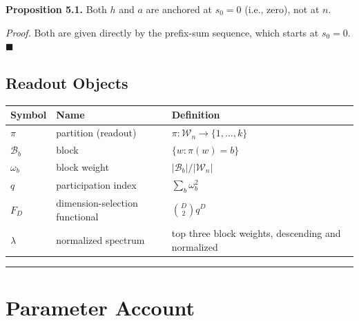 \documentclass[
  11pt,
]{article}
\newcounter{none} %
\begin{document}
\textbf{Proposition 5.1.} Both \(h\) and \(a\) are anchored at \(s_0=0\)
(i.e., zero), not at \(n\).

\emph{Proof.} Both are given directly by the prefix-sum sequence, which
starts at \(s_0=0\). \(\blacksquare\)

\subsection{Readout Objects}\label{readout-objects}

{\def\LTcaptype{none} %
\begin{longtable}[]{@{}
  >{\raggedright\arraybackslash}p{}
  >{\raggedright\arraybackslash}p{}
  >{\raggedright\arraybackslash}p{}@{}}
\toprule\noalign{}
\begin{minipage}[b]{\linewidth}\raggedright
Symbol
\end{minipage} & \begin{minipage}[b]{\linewidth}\raggedright
Name
\end{minipage} & \begin{minipage}[b]{\linewidth}\raggedright
Definition
\end{minipage} \\
\midrule\noalign{}
\endhead
\bottomrule\noalign{}
\endlastfoot
\(\pi\) & partition (readout) & \(\pi:\mathcal{W}_n\to\{1,\dots,k\}\) \\
\(\mathcal{B}_b\) & block & \(\{w:\pi(w)=b\}\) \\
\(\omega_b\) & block weight &
\(\rvert\mathcal{B}_b\rvert/\rvert\mathcal{W}_n\rvert\) \\
\(q\) & participation index & \(\sum_b\omega_b^2\) \\
\(F_D\) & dimension-selection functional & \(\binom{D}{2}q^D\) \\
\(\lambda\) & normalized spectrum & top three block weights, descending
and normalized \\
\end{longtable}
}

\begin{center}\rule{0.5\linewidth}{0.5pt}\end{center}

\section{Parameter Account}\label{parameter-account}
\end{document}

